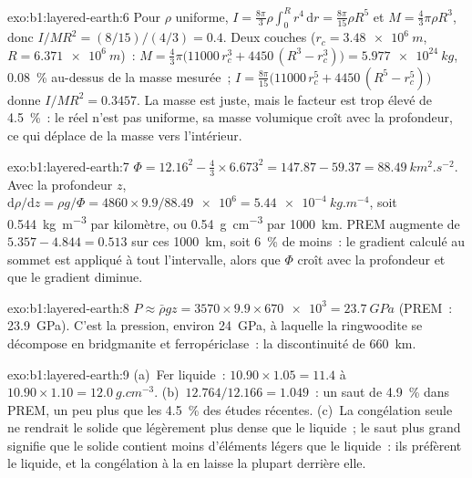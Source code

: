 \begin{solution}{exo:b1:layered-earth:6}
Pour $\rho$ uniforme, $I = \tfrac{8\pi}{3}\rho\int_0^R r^4\,\mathrm dr =
\tfrac{8\pi}{15}\rho R^5$ et $M = \tfrac43\pi\rho R^3$, donc
$I/MR^2 = (8/15)/(4/3) = 0.4$. Deux couches ($r_c = \qty{3.48e6}{m}$,
$R = \qty{6.371e6}{m}$)~: $M = \tfrac43\pi\bigl(11000\,r_c^3 + 4450\,(R^3 -
r_c^3)\bigr) = \qty{5.977e24}{kg}$, \qty{0.08}{\percent} au-dessus de la masse
mesurée~; $I = \tfrac{8\pi}{15}\bigl(11000\,r_c^5 + 4450\,(R^5 - r_c^5)\bigr)$
donne $I/MR^2 = 0.3457$. La masse est juste, mais le facteur est trop élevé de
\qty{4.5}{\percent}~: le  réel n'est pas uniforme, sa masse volumique
croît avec la profondeur, ce qui déplace de la masse vers l'intérieur.
\end{solution}

\begin{solution}{exo:b1:layered-earth:7}
$\Phi = 12.16^2 - \tfrac43\times6.673^2 = 147.87 - 59.37 =
\qty{88.49}{km^2.s^{-2}}$. Avec la profondeur $z$,
$\mathrm d\rho/\mathrm dz = \rho g/\Phi = 4860\times9.9/\num{88.49e6} =
\qty{5.44e-4}{kg.m^{-4}}$, soit \qty{0.544}{kg.m^{-3}} par kilomètre, ou
\qty{0.54}{g.cm^{-3}} par \qty{1000}{km}. PREM augmente de $5.357 - 4.844 =
0.513$ sur ces \qty{1000}{km}, soit \qty{6}{\percent} de moins~: le gradient
calculé au sommet est appliqué à tout l'intervalle, alors que $\Phi$ croît avec
la profondeur et que le gradient diminue.
\end{solution}

\begin{solution}{exo:b1:layered-earth:8}
$P \approx \bar\rho g z = 3570\times9.9\times\num{670e3} = \qty{23.7}{GPa}$
(PREM~: \qty{23.9}{GPa}). C'est la pression, environ \qty{24}{GPa}, à laquelle la
ringwoodite se décompose en bridgmanite et ferropériclase~: la discontinuité de
\qty{660}{km}.
\end{solution}

\begin{solution}{exo:b1:layered-earth:9}
(a)~Fer liquide~: $10.90\times1.05 = 11.4$ à $10.90\times1.10 =
\qty{12.0}{g.cm^{-3}}$. (b)~$12.764/12.166 = 1.049$~: un saut de
\qty{4.9}{\percent} dans PREM, un peu plus que les \qty{4.5}{\percent} des
études récentes. (c)~La congélation seule ne rendrait le solide que légèrement
plus dense que le liquide~; le saut plus grand signifie que le solide contient
moins d'éléments légers que le liquide~: ils préfèrent le liquide, et la
congélation à la  en laisse la plupart derrière elle.
\end{solution}

